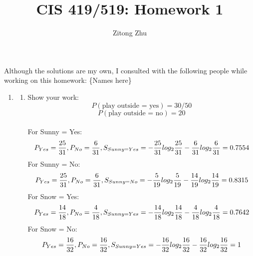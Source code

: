\documentclass{article}
\title{CIS 419/519: Homework 1}
\author{Zitong Zhu}
\date{}
\begin{document}
    \maketitle
    Although the solutions are my own, I consulted with the following people while working on this homework: \{Names here\}

    \begin{enumerate}
        \item %
        \begin{enumerate}
            \item %
            Show your work:
            \begin{equation*}
                P(\textrm{play outside = yes}) = 30/50
            \end{equation*}
            \begin{equation*}
                P(\textrm{play outside = no}) = 20
            \end{equation*}\\
            For Sunny = Yes: \\
            \begin{equation*}
            	P_{Yes}=\frac{25}{31}, P_{No}=\frac{6}{31},\\
            S_{Sunny=Yes}=-\frac{25}{31} log_{2} \frac{25}{31} - \frac{6}{31} log_{2} \frac{6}{31}=0.7554
            \end{equation*}
            For Sunny = No: \\
             \begin{equation*}
            	P_{Yes}=\frac{25}{31}, P_{No}=\frac{6}{31},\\
            S_{Sunny=No}=-\frac{5}{19} log_{2} \frac{5}{19} - \frac{14}{19} log_{2} \frac{14}{19}=0.8315
            \end{equation*}
            For Snow = Yes: \\
             \begin{equation*}
            	P_{Yes}=\frac{14}{18}, P_{No}=\frac{4}{18},\\
            S_{Sunny=Yes}=-\frac{14}{18} log_{2} \frac{14}{18} - \frac{4}{18} log_{2} \frac{4}{18}=0.7642
            \end{equation*}
            For Snow = No: \\
             \begin{equation*}
            	P_{Yes}=\frac{16}{32}, P_{No}=\frac{16}{32},\\
            S_{Sunny=Yes}=-\frac{16}{32} log_{2} \frac{16}{32} - \frac{16}{32} log_{2} \frac{16}{32}=1
            \end{equation*}
            

\end{enumerate}
\end{enumerate}
\end{document}

